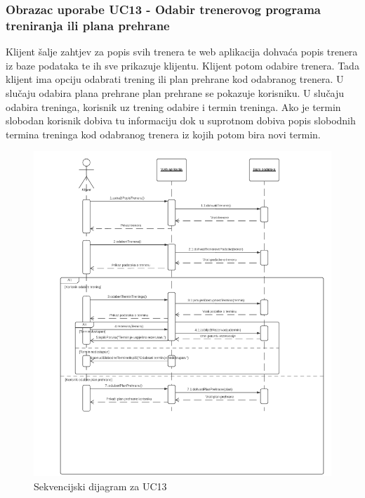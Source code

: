                     
                    \subsubsection{Obrazac uporabe UC13 - Odabir trenerovog programa treniranja ili plana prehrane}
					\textit{}Klijent šalje zahtjev za popis svih trenera te web aplikacija dohvaća popis trenera
                    iz baze podataka te ih sve prikazuje klijentu. Klijent potom odabire trenera. Tada
                    klijent ima opciju odabrati trening ili plan prehrane kod odabranog trenera. U slučaju
                    odabira plana prehrane plan prehrane se pokazuje korisniku. U slučaju odabira treninga,
                    korisnik uz trening odabire i termin treninga. Ako je termin slobodan korisnik dobiva tu
                    informaciju dok u suprotnom dobiva popis slobodnih termina treninga kod odabranog trenera
                    iz kojih potom bira novi termin.\\
                    
                    \begin{figure}[H]
			            \includegraphics[scale=0.9]{slike/UC13.PNG} %
			            \centering
			            \caption{Sekvencijski dijagram za UC13}
			            \label{fig:promjene}
		            \end{figure}
                    
